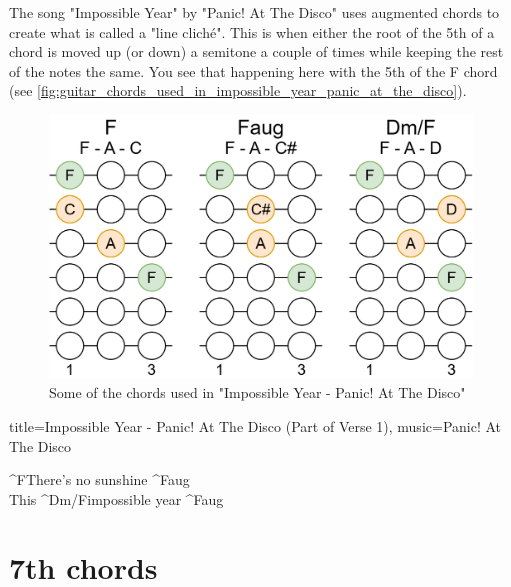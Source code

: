 
The song "Impossible Year" by "Panic! At The Disco" uses augmented chords to create what is called a "line cliché". This is when either the root of the 5th of a chord is moved up (or down) a semitone a couple of times while keeping the rest of the notes the same. You see that happening here with the 5th of the F chord (see \autoref{fig:guitar_chords_used_in_impossible_year_panic_at_the_disco}).

\begin{figure}[h]
	\centering
	\includegraphics[height=0.16\textheight]{../../Images/ChordsUsedInImpossibleYearPanicAtTheDisco.png}
	\caption{Some of the chords used in "Impossible Year - Panic! At The Disco"}
	\label{fig:guitar_chords_used_in_impossible_year_panic_at_the_disco}
\end{figure}

\begin{song}[verse/numbered, align-chords=l]{title={Impossible Year - Panic! At The Disco (Part of Verse 1)}, music={Panic! At The Disco}}
	\begin{chorus}
		^{F}There's no sunshine ^{Faug} \\
		This ^{Dm/F}impossible year ^{Faug} \\
	\end{chorus}
\end{song}

\newpage

\section{7th chords}

